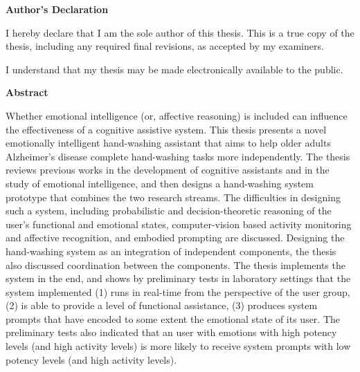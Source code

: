 \pagestyle{plain}
\setcounter{page}{2}

\cleardoublepage %
 



\begin{center}\textbf{Author's Declaration}\end{center}

  \noindent
I hereby declare that I am the sole author of this thesis. This is a true copy of the thesis, including any required final revisions, as accepted by my examiners.

  \bigskip
  
  \noindent
I understand that my thesis may be made electronically available to the public.

\cleardoublepage


\begin{center}\textbf{Abstract}\end{center}

Whether emotional intelligence (or, affective reasoning) is included can influence the effectiveness of a cognitive assistive system. This thesis presents a novel emotionally intelligent hand-washing assistant that aims to help older adults Alzheimer's disease complete hand-washing tasks more independently. The thesis reviews previous works in the development of cognitive assistants and in the study of emotional intelligence, and then designs a hand-washing system prototype that combines the two research streams. The difficulties in designing such a system, including probabilistic and decision-theoretic reasoning of the user's functional and emotional states, computer-vision based activity monitoring and affective recognition, and embodied prompting are discussed. Designing the hand-washing system as an integration of independent components, the thesis also discussed coordination between the components. The thesis implements the system in the end, and shows by preliminary tests in laboratory settings that the system implemented (1) runs in real-time from the perspective of the user group, (2) is able to provide a level of functional assistance, (3) produces system prompts that have encoded to some extent the emotional state of its user. The preliminary tests also indicated that an user with emotions with high potency levels (and high activity levels) is more likely to receive system prompts with low potency levels (and high activity levels).

